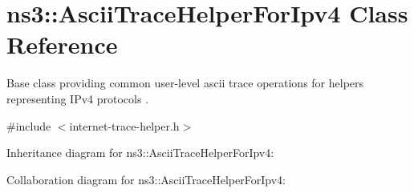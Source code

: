 \hypertarget{classns3_1_1AsciiTraceHelperForIpv4}{}\section{ns3\+:\+:Ascii\+Trace\+Helper\+For\+Ipv4 Class Reference}
\label{classns3_1_1AsciiTraceHelperForIpv4}


Base class providing common user-\/level ascii trace operations for helpers representing I\+Pv4 protocols .  




{\ttfamily \#include $<$internet-\/trace-\/helper.\+h$>$}



Inheritance diagram for ns3\+:\+:Ascii\+Trace\+Helper\+For\+Ipv4\+:


Collaboration diagram for ns3\+:\+:Ascii\+Trace\+Helper\+For\+Ipv4\+:
